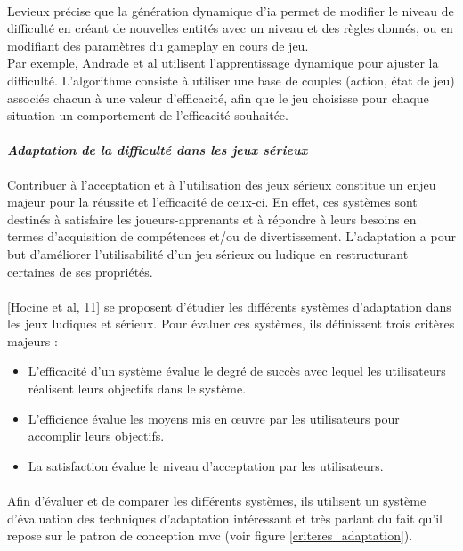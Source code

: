 \paragraph{}
Levieux précise que la génération dynamique d’\gls{ia} permet de modifier le niveau de difficulté en créant de nouvelles entités avec un niveau et des règles donnés, ou en modifiant des paramètres du gameplay en cours de jeu.\\
Par exemple, Andrade et al utilisent l’apprentissage dynamique pour ajuster la difficulté. L’algorithme consiste à utiliser une base de couples (action, état de jeu) associés chacun à une valeur d’efficacité, afin que le jeu choisisse pour chaque situation un comportement de l’efficacité souhaitée.

		\paragraph{\emph{Adaptation de la difficulté dans les jeux sérieux} \\ \quad}
Contribuer à l'acceptation et à l'utilisation des jeux sérieux constitue un enjeu majeur pour la réussite et l'efficacité de ceux-ci. En effet, ces systèmes sont destinés à satisfaire les joueurs-apprenants et à répondre à leurs besoins en termes d'acquisition de compétences et/ou de divertissement. L’adaptation a pour but d’améliorer l’utilisabilité d’un jeu sérieux ou ludique en restructurant certaines de ses propriétés.

\paragraph{}
[Hocine et al, 11] se proposent d'étudier les différents systèmes d'adaptation dans les jeux ludiques et sérieux. Pour évaluer ces systèmes, ils définissent trois critères majeurs :
\begin{itemize}
	\item L’efficacité d’un système évalue le degré de succès avec lequel les utilisateurs réalisent leurs objectifs dans le système.
	\item L’efficience évalue les moyens mis en œuvre par les utilisateurs pour accomplir leurs objectifs.
	\item La satisfaction évalue le niveau d’acceptation par les utilisateurs.
\end{itemize}

\paragraph{}
Afin d'évaluer et de comparer les différents systèmes, ils utilisent un système d'évaluation des techniques d'adaptation intéressant et très parlant du fait qu'il repose sur le patron de conception \gls{mvc} (voir figure \ref{criteres_adaptation}).

